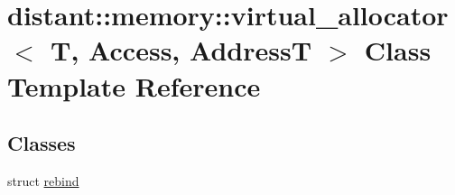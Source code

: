 \hypertarget{classdistant_1_1memory_1_1virtual__allocator}{}\section{distant\+:\+:memory\+:\+:virtual\+\_\+allocator$<$ T, Access, AddressT $>$ Class Template Reference}
\label{classdistant_1_1memory_1_1virtual__allocator}
\subsection*{Classes}
\begin{DoxyCompactItemize}
\item 
struct \mbox{\hyperlink{structdistant_1_1memory_1_1virtual__allocator_1_1rebind}{rebind}}
\end{DoxyCompactItemize}

